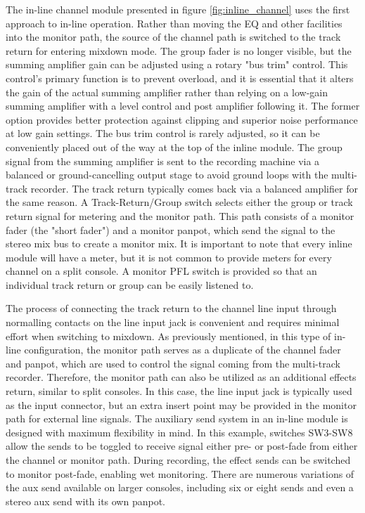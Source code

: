 The in-line channel module presented in figure \ref{fig:inline_channel}
uses the first approach to in-line operation. Rather than moving the EQ and
other facilities into the monitor path, the source of the channel path is
switched to the track return for entering mixdown mode.
The group fader is no longer visible, but the summing amplifier gain can
be adjusted using a rotary "bus trim" control. This control's primary function
is to prevent overload, and it is essential that it alters the gain of the
actual summing amplifier rather than relying on a low-gain summing amplifier
with a level control and post amplifier following it. The former option
provides better protection against clipping and superior noise performance at
low gain settings. The bus trim control is rarely adjusted, so it can be
conveniently placed out of the way at the top of the inline module. The group
signal from the summing amplifier is sent to the recording machine via a
balanced or ground-cancelling output stage to avoid ground loops with the
multi-track recorder. The track return typically comes back via a balanced
amplifier for the same reason. A Track-Return/Group switch selects either the
group or track return signal for metering and the monitor path. This path
consists of a monitor fader (the "short fader") and a monitor panpot, which
send the signal to the stereo mix bus to create a monitor mix. It is important
to note that every inline module will have a meter, but it is not common to
provide meters for every channel on a split console. A monitor PFL switch is
provided so that an individual track return or group can be easily listened to.

The process of connecting the track return to the channel line input through
normalling contacts on the line input jack is convenient and requires minimal
effort when switching to mixdown. As previously mentioned, in this type of
in-line configuration, the monitor path serves as a duplicate of the channel
fader and panpot, which are used to control the signal coming from the
multi-track recorder. Therefore, the monitor path can also be utilized as an
additional effects return, similar to split consoles. In this case, the line
input jack is typically used as the input connector, but an extra insert point
may be provided in the monitor path for external line signals. The auxiliary
send system in an in-line module is designed with maximum flexibility in mind.
In this example, switches SW3-SW8 allow the sends to be toggled to receive
signal either pre- or post-fade from either the channel or monitor path. During
recording, the effect sends can be switched to monitor post-fade, enabling wet
monitoring. There are numerous variations of the aux send available on larger
consoles, including six or eight sends and even a stereo aux send with its own
panpot.

